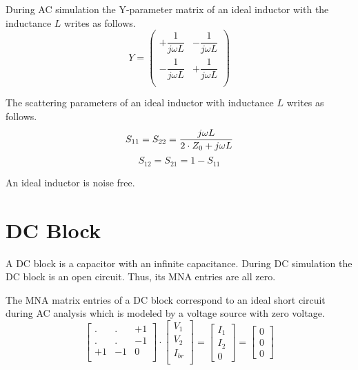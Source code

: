 During AC simulation the Y-parameter matrix of an ideal inductor
with the inductance $L$ writes as follows.
\begin{equation}
Y =
\begin{pmatrix}
+\dfrac{1}{j\omega L} & -\dfrac{1}{j\omega L}\\
-\dfrac{1}{j\omega L} & +\dfrac{1}{j\omega L}\\
\end{pmatrix}
\end{equation}

The scattering parameters of an ideal inductor with inductance $L$
writes as follows.
\begin{equation}
S_{11} = S_{22} = \frac{j\omega L}{2\cdot Z_0 + j\omega L} \\
\end{equation}
\begin{equation}
S_{12} = S_{21} = 1-S_{11}
\end{equation}

An ideal inductor is noise free.


\section{DC Block}

A DC block is a capacitor with an infinite capacitance. During DC
simulation the DC block is an open circuit. Thus, its MNA
entries are all zero.

\addvspace{12pt}

The MNA matrix entries of a DC block correspond to an ideal short
circuit during AC analysis which is modeled by a voltage source with
zero voltage.
\begin{equation}
\begin{bmatrix}
. & . & +1\\
. & . & -1\\
+1 & -1 & 0\\
\end{bmatrix}
\cdot
\begin{bmatrix}
V_1\\
V_2\\
I_{br}\\
\end{bmatrix}
=
\begin{bmatrix}
I_1\\
I_2\\
0
\end{bmatrix}
=
\begin{bmatrix}
0\\
0\\
0
\end{bmatrix}
\end{equation}

